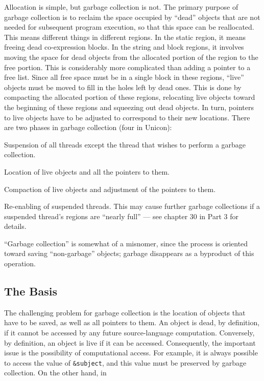 Allocation is simple, but garbage collection is not. The primary
purpose of garbage collection is to reclaim the space occupied by
``dead'' objects that are not needed for subsequent program execution,
so that this space can be reallocated. This means different things in
different regions. In the static region, it means freeing dead
co-expression blocks. In the string and block regions, it involves
moving the space for dead objects from the allocated portion of the
region to the free portion. This is considerably more complicated than
adding a pointer to a free list. Since all free space must be in a
single block in these regions, ``live'' objects must be moved to fill
in the holes left by dead ones. This is done by compacting the
allocated portion of these regions, relocating live objects toward the
beginning of these regions and squeezing out dead objects. In turn,
pointers to live objects have to be adjusted to correspond to their
new locations. There are two phases in garbage collection
{\color{blue} (four in Unicon)}:

\liststyleLxii
\begin{itemize}
{\color{blue}
\item
  Suspension of all threads except the thread that wishes to perform a
  garbage collection.
}
\item 
  Location of live objects and all the pointers to them.
\item 
  Compaction of live objects and adjustment of the pointers to them.
{\color{blue}
\item
  Re-enabling of suspended threads. This may cause further garbage
  collections if a suspended thread's regions are ``nearly full'' ---
  see chapter 30 in Part 3 for details.
}
\end{itemize}

``Garbage collection'' is somewhat of a misnomer, since the process is
oriented toward saving ``non-garbage'' objects; garbage disappears as
a byproduct of this operation.

\subsection{The Basis}

The challenging problem for garbage collection is the location of
objects that have to be saved, as well as all pointers to them. An
object is dead, by definition, if it cannot be accessed by any future
source-language computation.  Conversely, by definition, an object is
live if it can be accessed. Consequently, the important issue is the
possibility of computational access. For example, it is always
possible to access the value of \texttt{\&subject}, and this value
must be preserved by garbage collection. On the other hand, in

